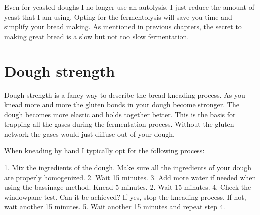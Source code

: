 Even for yeasted doughs I no longer use an autolysis. I just reduce the amount
of yeast that I am using. Opting for the fermentolysis will
save you time and simplify your bread making. As mentioned in previous chapters,
the secret to making great bread is a slow but not too slow fermentation.

\section{Dough strength}

Dough strength is a fancy way to describe the bread kneading process. As you
knead more and more the gluten bonds in your dough become stronger. The dough
becomes more elastic and holds together better. This is the basis for trapping
all the gases during the fermentation process. Without the gluten network
the gases would just diffuse out of your dough.

When kneading by hand I typically opt for the following process:

1. Mix the ingredients of the dough. Make sure all the ingredients of your
dough are properly homogenized.
2. Wait 15 minutes.
3. Add more water if needed when using the bassinage method. Knead 5 minutes.
2. Wait 15 minutes.
4. Check the windowpane test. Can it be achieved? If yes, stop the kneading
process. If not, wait another 15 minutes.
5. Wait another 15 minutes and repeat step 4.


